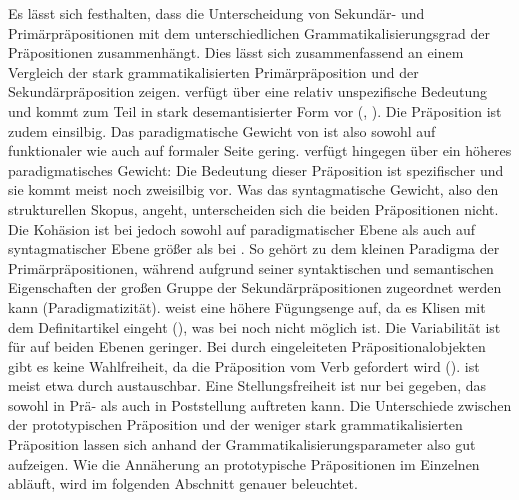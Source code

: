 Es lässt sich festhalten, dass die Unterscheidung von Sekundär- und Primärpräpositionen mit dem unterschiedlichen Grammatikalisierungsgrad der Präpositionen zusammenhängt. 
Dies lässt sich zusammenfassend an einem Vergleich der stark grammatikalisierten Primärpräposition  und der Sekundärpräposition \wegen{} zeigen. 
 verfügt über eine relativ unspezifische Bedeutung und kommt zum Teil in stark desemantisierter Form vor (, ). 
Die Präposition ist zudem einsilbig. 
Das paradigmatische Gewicht von  ist also sowohl auf funktionaler wie auch auf formaler Seite gering. 
 verfügt hingegen über ein höheres paradigmatisches Gewicht: Die Bedeutung dieser Präposition ist spezifischer und sie kommt meist noch zweisilbig vor. 
Was das syntagmatische Gewicht, also den strukturellen Skopus, angeht, unterscheiden sich die beiden Präpositionen nicht. %
Die Kohäsion ist bei  jedoch sowohl auf paradigmatischer Ebene als auch auf syntagmatischer Ebene größer als bei \wegen. 
So gehört  zu dem kleinen Paradigma der Primärpräpositionen, während \wegen{} aufgrund seiner syntaktischen und semantischen Eigenschaften der großen Gruppe der Sekundärpräpositionen zugeordnet werden kann (Paradigmatizität).
 weist eine höhere Fügungsenge auf, da es Klisen mit dem Definitartikel eingeht (), was bei \wegen{} noch nicht möglich ist. 
Die Variabilität ist für  auf beiden Ebenen geringer. 
Bei durch  eingeleiteten Präpositionalobjekten gibt es keine Wahlfreiheit, da die Präposition vom Verb gefordert wird (). 
 ist meist etwa durch  austauschbar. 
Eine Stellungsfreiheit ist nur bei \wegen{} gegeben, das sowohl in Prä- als auch in Poststellung auftreten kann. 
Die Unterschiede zwischen der prototypischen Präposition  und der weniger stark grammatikalisierten Präposition \wegen{} lassen sich anhand der Grammatikalisierungsparameter also gut aufzeigen. 
Wie die Annäherung an prototypische Präpositionen im Einzelnen abläuft, wird im folgenden Abschnitt genauer beleuchtet. 
